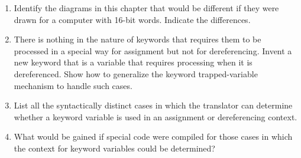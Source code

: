 \begin{enumerate}
\item Identify the diagrams in this chapter that would be different if
they were drawn for a computer with 16-bit words.  Indicate the
differences.

\item There is nothing in the nature of keywords that requires them to
be processed in a special way for assignment but not for
dereferencing. Invent a new keyword that is a variable that requires
processing when it is dereferenced. Show how to generalize the keyword
trapped-variable mechanism to handle such cases.

\item List all the syntactically distinct cases in which the
translator can determine whether a keyword variable is used in an
assignment or dereferencing context.

\item What would be gained if special code were compiled for those
cases in which the context for keyword variables could be determined?

\end{enumerate}
